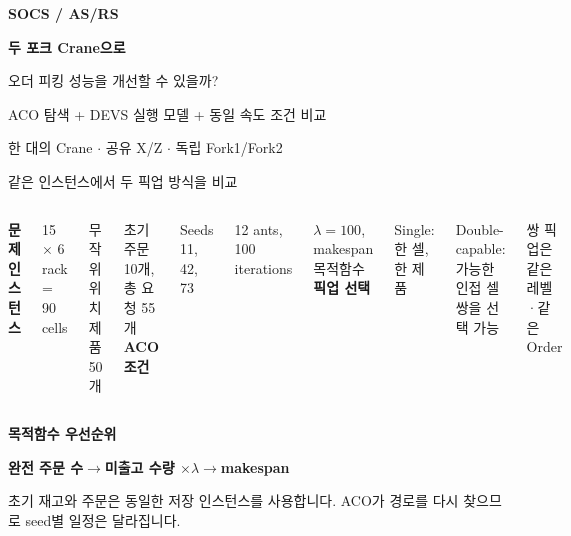 \documentclass[aspectratio=169,11pt]{beamer}
\begin{document}
\begin{frame}[plain]
\vspace{0.78cm}
{\scriptsize\bfseries\color{teal}SOCS  /  AS/RS}\par\vspace{0.40cm}
{\huge\bfseries\color{navy}두 포크 Crane으로\par 오더 피킹 성능을 개선할 수 있을까?}\par\vspace{0.30cm}
{\large\color{muted}ACO 탐색  +  DEVS 실행 모델  +  동일 속도 조건 비교}\par\vspace{0.45cm}
\par\vspace{0.20cm}
{\normalsize\color{muted}한 대의 Crane  $\cdot$  공유 X/Z  $\cdot$  독립 Fork1/Fork2}\par
\end{frame}

\begin{frame}{같은 인스턴스에서 두 픽업 방식을 비교}
\begin{columns}[T,onlytextwidth]
{\color{teal}\bfseries 문제 인스턴스}\par\vspace{0.15cm}
15 $\times$ 6 rack = 90 cells\par
무작위 위치 제품 50개\par
초기 주문 10개, 총 요청 55개
{\color{orange}\bfseries ACO 조건}\par\vspace{0.15cm}
Seeds 11, 42, 73\par
12 ants, 100 iterations\par
$\lambda=100$, makespan 목적함수
{\color{gold}\bfseries 픽업 선택}\par\vspace{0.15cm}
Single: 한 셀, 한 제품\par
Double-capable: 가능한 인접 셀 쌍을 선택 가능\par
쌍 픽업은 같은 레벨·같은 Order
\end{columns}
\vspace{0.25cm}
\begin{center}\small\color{teal}\bfseries 목적함수 우선순위\end{center}
\begin{center}\large\bfseries 완전 주문 수\quad$\rightarrow$\quad 미출고 수량 $\times\lambda$\quad$\rightarrow$\quad makespan\end{center}
\vspace{0.2cm}
\small\color{muted}초기 재고와 주문은 동일한 저장 인스턴스를 사용합니다. ACO가 경로를 다시 찾으므로 seed별 일정은 달라집니다.
\end{frame}
\end{document}
